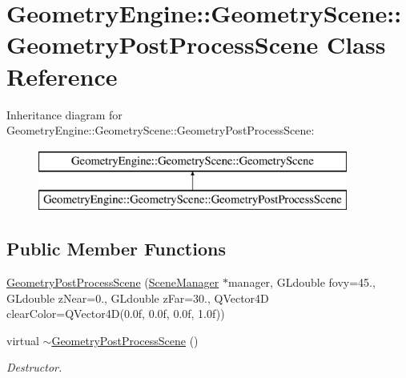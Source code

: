 \hypertarget{class_geometry_engine_1_1_geometry_scene_1_1_geometry_post_process_scene}{}\section{Geometry\+Engine\+::Geometry\+Scene\+::Geometry\+Post\+Process\+Scene Class Reference}
\label{class_geometry_engine_1_1_geometry_scene_1_1_geometry_post_process_scene}
Inheritance diagram for Geometry\+Engine\+::Geometry\+Scene\+::Geometry\+Post\+Process\+Scene\+:\begin{figure}[H]
\begin{center}
\leavevmode
\includegraphics[height=2.000000cm]{class_geometry_engine_1_1_geometry_scene_1_1_geometry_post_process_scene}
\end{center}
\end{figure}
\subsection*{Public Member Functions}
\begin{DoxyCompactItemize}
\item 
\mbox{\hyperlink{class_geometry_engine_1_1_geometry_scene_1_1_geometry_post_process_scene_a4ef1d9008da400fd12a0a912205368ff}{Geometry\+Post\+Process\+Scene}} (\mbox{\hyperlink{class_geometry_engine_1_1_scene_manager}{Scene\+Manager}} $\ast$manager, G\+Ldouble fovy=45., G\+Ldouble z\+Near=0., G\+Ldouble z\+Far=30., Q\+Vector4D clear\+Color=Q\+Vector4D(0.\+0f, 0.\+0f, 0.\+0f, 1.\+0f))
\item 
\mbox{\label{class_geometry_engine_1_1_geometry_scene_1_1_geometry_post_process_scene_aece944be67eb351197e77366e86f9a80}} 
virtual \mbox{\hyperlink{class_geometry_engine_1_1_geometry_scene_1_1_geometry_post_process_scene_aece944be67eb351197e77366e86f9a80}{$\sim$\+Geometry\+Post\+Process\+Scene}} ()
\begin{DoxyCompactList}\small\item\em Destructor. \end{DoxyCompactList}\end{DoxyCompactItemize}
